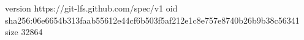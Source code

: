 version https://git-lfs.github.com/spec/v1
oid sha256:06e6654b313faab55612e44cf6b503f5af212e1c8e757e8740b26b9b38c56341
size 32864
